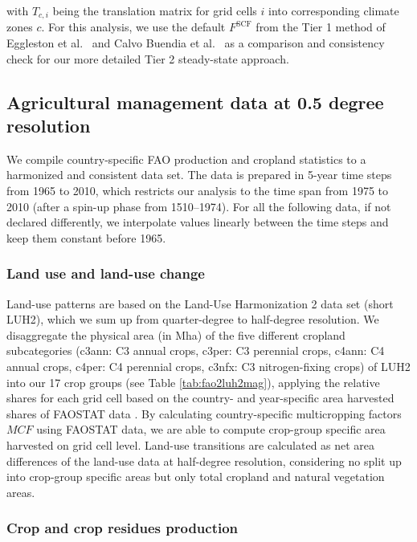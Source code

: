 \documentclass[gc, manuscript]{copernicus}
\begin{document}
with \(T_{c,i}\) being the translation matrix for grid cells \(i\) into corresponding climate zones \(c\). For this analysis, we use the default \(F^{\mathrm{SCF}}\) from the Tier 1 method of Eggleston et al.~\citeyearpar{eggleston_ipcc_2006} and Calvo Buendia et al.~\citeyearpar{calvo_buendia_ipcc_2019} as a comparison and consistency check for our more detailed Tier 2 steady-state approach.

\hypertarget{sec:agrimanagement}{%
\subsection{Agricultural management data at 0.5 degree resolution}\label{sec:agrimanagement}}

We compile country-specific FAO production and cropland statistics \citep{faostat_faostat_2016} to a harmonized and consistent data set. The data is prepared in 5-year time steps from 1965 to 2010, which restricts our analysis to the time span from 1975 to 2010 (after a spin-up phase from 1510--1974). For all the following data, if not declared differently, we interpolate values linearly between the time steps and keep them constant before 1965.

\hypertarget{sec:landuse}{%
\subsubsection{Land use and land-use change}\label{sec:landuse}}

Land-use patterns are based on the Land-Use Harmonization 2 \citep{hurtt_harmonization_2020} data set (short LUH2), which we sum up from quarter-degree to half-degree resolution. We disaggregate the physical area (in Mha) of the five different cropland subcategories (c3ann: C3 annual crops, c3per: C3 perennial crops, c4ann: C4 annual crops, c4per: C4 perennial crops, c3nfx: C3 nitrogen-fixing crops) of LUH2 into our 17 crop groups (see Table \ref{tab:fao2luh2mag}), applying the relative shares for each grid cell based on the country- and year-specific area harvested shares of FAOSTAT data \citep{faostat_faostat_2016}. By calculating country-specific multicropping factors \(MCF\) using FAOSTAT data, we are able to compute crop-group specific area harvested on grid cell level.
Land-use transitions are calculated as net area differences of the land-use data at half-degree resolution, considering no split up into crop-group specific areas but only total cropland and natural vegetation areas.

\hypertarget{sec:residues}{%
\subsubsection{Crop and crop residues production}\label{sec:residues}}
\end{document}
